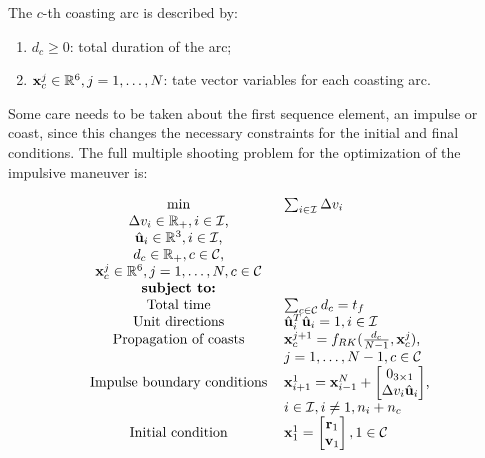 The \(c\)-th coasting arc is described by:
\begin{enumerate}
    \item \(d_c \geq 0\): total duration of the arc;
    \item \(\mathbf{x}^j_c \in \mathbb{R}^6, j=1,\dots,N\): tate vector variables for each coasting arc. 
\end{enumerate}

Some care needs to be taken about the first sequence element, an impulse or coast, since this changes the necessary constraints for the initial and final conditions. The full multiple shooting problem for the optimization of the impulsive maneuver is:

\begin{align}\label{eq:ms_problem}
    \begin{tabular}{cl}
     \(\min\)                              & \(\sum_{i \in \mathcal{I}} \Delta v_i\)\\
    \(\Delta v_i  \in \R_+, i \in \mathcal{I}\), &  \\
    \(\hat{\uc}_i \in \R^3, i \in \mathcal{I}\),     & \\
    \(d_c         \in \R_+, c \in \mathcal{C}\),     & \\
    \(\x^j_c      \in \R^6, j=1,\dots,N, c \in \mathcal{C}\) & \\
    \textbf{subject to:}        & \\
    Total time                  & \(\sum_{c \in \mathcal{C}} d_c = t_f\) \\
    Unit directions             & \(\hat{\uc}_i^T \hat{\uc}_i = 1, i \in \mathcal{I}\) \\
    Propagation of coasts       & \(\x^{j+1}_c = f_{RK}(\frac{d_c}{N-1}, \x^j_c)\), \\
                                & \(j=1,\dots,N-1, c \in \mathcal{C}\) \\
    Impulse boundary conditions & \(\x^1_{i+1} = \x^{N}_{i-1} + \begin{bmatrix}
        0_{3\times1} \\ \Delta v_i \hat{\mathbf{u}}_i
    \end{bmatrix}\), \\
                                & \(i \in \mathcal{I}, i \neq 1, n_i+n_c\) \\
    Initial condition           & \(\x_1^1 = \begin{bmatrix}
        \mathbf{r}_1 \\ \mathbf{v}_1
    \end{bmatrix}, 1 \in \mathcal{C}\) \\

\end{tabular}
\end{align}
